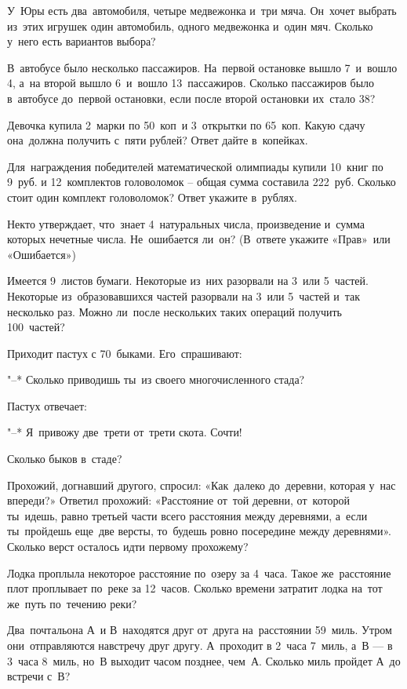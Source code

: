 У~Юры есть два~автомобиля, четыре медвежонка и~три мяча. Он~хочет выбрать из~этих игрушек один автомобиль, 
одного медвежонка и~один мяч. Сколько у~него есть вариантов выбора?

В~автобусе было несколько пассажиров. На~первой остановке вышло 7~и~вошло 4, а~на второй вышло 6~и~вошло 13~пассажиров. 
Сколько пассажиров было в~автобусе до~первой остановки, если после второй остановки их~стало 38?

Девочка купила 2~марки по 50~коп~и 3~открытки по 65~коп. Какую сдачу она~должна получить с~пяти рублей? 
Ответ дайте в~копейках.

Для~награждения победителей математической олимпиады купили 10~книг по 9~руб. 
и 12~комплектов головоломок – общая сумма составила 222~руб. 
Сколько стоит один комплект головоломок? Ответ укажите в~рублях.

Некто утверждает, что~знает 4~натуральных числа, произведение и~сумма которых нечетные числа. 
Не~ошибается ли~он? (В~ответе укажите «Прав»~или «Ошибается»)

Имеется 9~листов бумаги. Некоторые из~них разорвали на 3~или 5~частей. 
Некоторые из~образовавшихся частей разорвали на 3~или 5~частей и~так несколько раз. 
Можно ли~после нескольких таких операций получить 100~частей?

Приходит пастух с 70~быками. Его~спрашивают:

"--* Сколько приводишь ты~из своего многочисленного стада?

Пастух отвечает:

"--* Я~привожу две~трети от~трети скота. Сочти!

Сколько быков в~стаде?

Прохожий, догнавший другого, спросил: «Как~далеко до~деревни, которая у~нас впереди?» 
Ответил прохожий: «Расстояние от~той деревни, от~которой ты~идешь, равно третьей части всего расстояния 
между деревнями, а~если ты~пройдешь еще~две версты, то~будешь ровно посередине между деревнями». 
Сколько верст осталось идти первому прохожему?

Лодка проплыла некоторое расстояние по~озеру за 4~часа. Такое же~расстояние плот проплывает по~реке за 12~часов. 
Сколько времени затратит лодка на~тот же~путь по~течению реки?

Два~почтальона А~и В~находятся друг от~друга на~расстоянии 59~миль. Утром они~отправляются навстречу друг другу. 
А~проходит в 2~часа 7~миль, а~В — в 3~часа 8~миль, но~В выходит часом позднее, чем~А. 
Сколько миль пройдет А~до встречи с~В?

